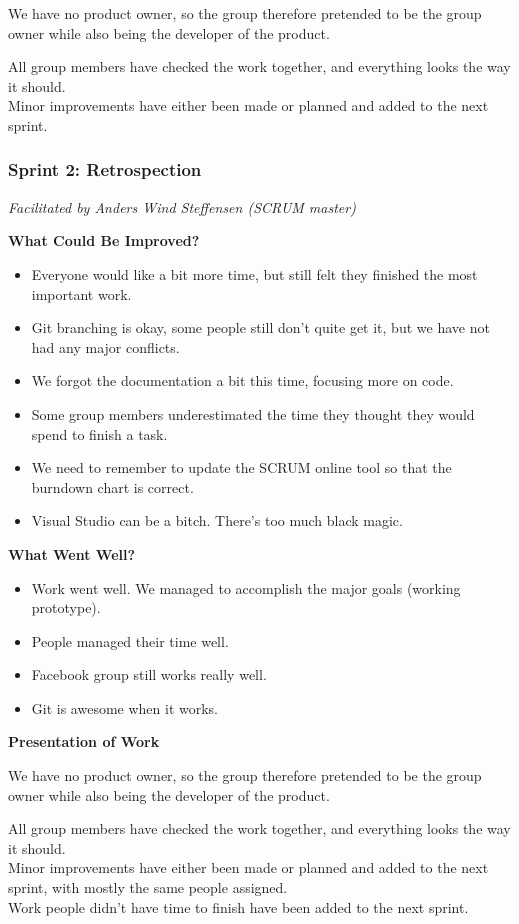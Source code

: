 We have no product owner, so the group therefore pretended to be the group owner while also being the developer of the product. 

All group members have checked the work together, and everything looks the way it should. \\
Minor improvements have either been made or planned and added to the next sprint. 


\subsubsection{Sprint 2: Retrospection}
\small{\textit{Facilitated by Anders Wind Steffensen (SCRUM master)}} 

\textbf{What Could Be Improved?}

\begin{itemize}
	\item Everyone would like a bit more time, but still felt they finished the most important work.
	\item Git branching is okay, some people still don't quite get it, but we have not had any major conflicts.
	\item We forgot the documentation a bit this time, focusing more on code. 
	\item Some group members underestimated the time they thought they would spend to finish a task.
	\item We need to remember to update the SCRUM online tool so that the burndown chart is correct.
	\item Visual Studio can be a bitch. There's too much black magic.
\end{itemize}

\textbf{What Went Well?}

\begin{itemize}
	\item Work went well. We managed to accomplish the major goals (working prototype).
	\item People managed their time well.
	\item Facebook group still works really well.
	\item Git is awesome when it works.
\end{itemize}

\textbf{Presentation of Work}

We have no product owner, so the group therefore pretended to be the group owner while also being the developer of the product.

All group members have checked the work together, and everything looks the way it should.\\
Minor improvements have either been made or planned and added to the next sprint, with mostly the same people assigned.\\
Work people didn't have time to finish have been added to the next sprint.

